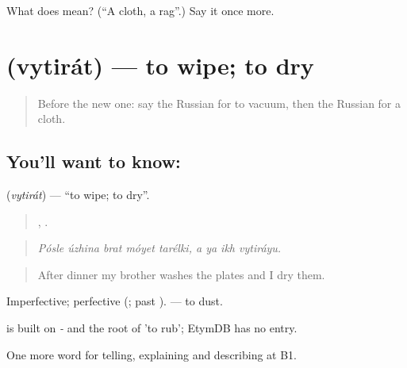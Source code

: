 \begin{tcolorbox}[breakable,colback=teal!4,colframe=teal!35!black,title={Before you move on}]
What does  mean? (\textquotedblleft{}A cloth, a rag\textquotedblright{}.) Say it once more.
\end{tcolorbox}
\section[\texorpdfstring{\ru{вытирать} (vytirát)}{вытирать (vytirát)}]{ (vytirát) — to wipe; to dry}

\label{lesson:RU-C529-vytirat}



\begin{quote}
Before the new one: say the Russian for to vacuum, then the Russian for a cloth.
\end{quote}

\subsection*{You'll want to know: }
\textbf{} (\emph{vytirát}) — \textquotedblleft{}to wipe; to dry\textquotedblright{}.

\begin{quote}
    ,    .
\end{quote}

\begin{quote}
\emph{Pósle úzhina brat móyet tarélki, a ya ikh vytiráyu.}
\end{quote}

\begin{quote}
After dinner my brother washes the plates and I dry them.
\end{quote}

Imperfective; perfective  (; past ). \emph{ } — to dust.

\begin{cousinweb}
\emph{} is built on \emph{-} and the root of \emph{} 'to rub'; EtymDB has no entry.
\end{cousinweb}

\begin{grammarlens}[title={What you've built}]
One more word for telling, explaining and describing at B1.
\end{grammarlens}


